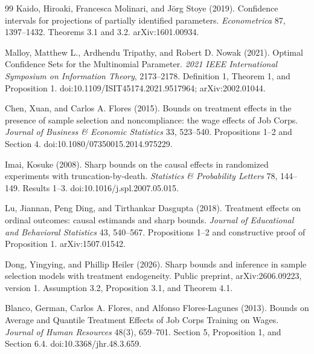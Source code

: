 \documentclass{article}
\begin{document}
\begin{thebibliography}{99}
   Kaido, Hiroaki, Francesca Molinari, and Jörg Stoye (2019). Confidence intervals for projections of partially identified parameters. \emph{Econometrica} 87, 1397--1432. Theorems 3.1 and 3.2. arXiv:1601.00934.

   Malloy, Matthew L., Ardhendu Tripathy, and Robert D. Nowak (2021). Optimal Confidence Sets for the Multinomial Parameter. \emph{2021 IEEE International Symposium on Information Theory}, 2173--2178. Definition 1, Theorem 1, and Proposition 1. doi:10.1109/ISIT45174.2021.9517964; arXiv:2002.01044.

   Chen, Xuan, and Carlos A. Flores (2015). Bounds on treatment effects in the presence of sample selection and noncompliance: the wage effects of Job Corps. \emph{Journal of Business \& Economic Statistics} 33, 523--540. Propositions 1--2 and Section 4. doi:10.1080/07350015.2014.975229.

   Imai, Kosuke (2008). Sharp bounds on the causal effects in randomized experiments with truncation-by-death. \emph{Statistics \& Probability Letters} 78, 144--149. Results 1--3. doi:10.1016/j.spl.2007.05.015.

   Lu, Jiannan, Peng Ding, and Tirthankar Dasgupta (2018). Treatment effects on ordinal outcomes: causal estimands and sharp bounds. \emph{Journal of Educational and Behavioral Statistics} 43, 540--567. Propositions 1--2 and constructive proof of Proposition 1. arXiv:1507.01542.

   Dong, Yingying, and Phillip Heiler (2026). Sharp bounds and inference in sample selection models with treatment endogeneity. Public preprint, arXiv:2606.09223, version 1. Assumption 3.2, Proposition 3.1, and Theorem 4.1.

   Blanco, German, Carlos A. Flores, and Alfonso Flores-Lagunes (2013). Bounds on Average and Quantile Treatment Effects of Job Corps Training on Wages. \emph{Journal of Human Resources} 48(3), 659--701. Section 5, Proposition 1, and Section 6.4. doi:10.3368/jhr.48.3.659.

\end{thebibliography}
\end{document}
